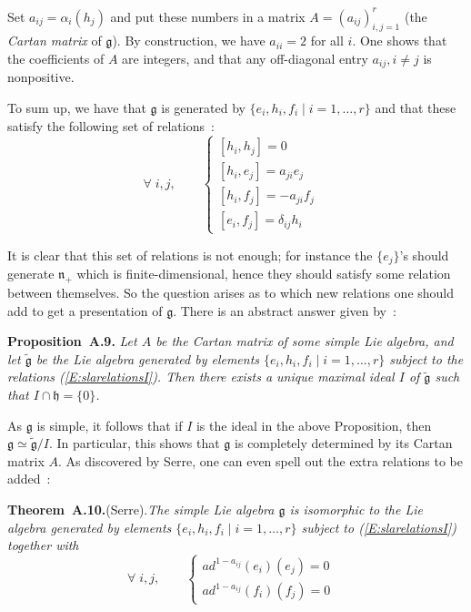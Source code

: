 \documentclass[a4paper,10pt]{amsart}
\def\g{\mathfrak{g}}
\def\h{\mathfrak{h}}
\def\n{\mathfrak{n}}
\numberwithin{equation}{section}
\begin{document}
{Set $a_{ij}=\alpha_i(h_j)$ and put these numbers in a matrix $A=(a_{ij})_{i,j=1}^r$ (the \textit{Cartan matrix} of $\g$). By construction, we have $a_{ii}=2$ for all $i$. One shows that the coefficients of $A$ are integers, and that any off-diagonal entry $a_{ij}, i \neq j$ is nonpositive.

To sum up, we have that $\g$ is generated by $\{e_i, h_i, f_i\;|\; i=1, \ldots , r\}$ and that these satisfy the following set of relations~:
\begin{equation}\label{E:slarelationsI}
\forall\; i,j, \qquad
\begin{cases}
[h_i,h_j]=0 & \\
[h_i, e_j]=a_{ji} e_j & \\
[h_i, f_j]=-a_{ji} f_j &\\
[e_i,f_j]= \delta_{ij} h_i
\end{cases}
\end{equation}

\vspace{.1in}

It is clear that this set of relations is not enough; for instance the $\{e_j\}$'s should generate $\n_+$ which is finite-dimensional, hence they should satisfy some relation between themselves. So the question arises as to which new relations one should add to get a presentation of $\g$. There is an abstract answer given by~:

\vspace{.15in}

\noindent
\textbf{Proposition~A.9.} \textit{Let $A$ be the Cartan matrix of some simple Lie algebra, and let $\widetilde{\g}$ be the Lie algebra generated by elements $\{e_i, h_i, f_i\;|\; i=1, \ldots , r\}$ subject to the relations (\ref{E:slarelationsI}). Then there exists a unique maximal ideal $I$ of $\widetilde{\g}$ such that $I \cap \h =\{0\}$.}

\vspace{.15in}

As $\g$ is simple, it follows that if $I$ is the ideal in the above Proposition, then $\g \simeq \widetilde{\g}/ I$. In particular, this shows that $\g$ is completely determined by its Cartan matrix $A$.
As discovered by Serre, one can even spell out the extra relations to be added~:

\vspace{.15in}

\noindent
\textbf{Theorem~A.10.}(Serre).\textit{The simple Lie algebra $\g$ is isomorphic to the Lie algebra generated by elements $\{e_i, h_i, f_i\;|\; i=1, \ldots , r\}$ subject to (\ref{E:slarelationsI}) together with
\begin{equation}\label{E:Serrerel}
\forall\; i,j, \qquad
\begin{cases}
ad^{1-a_{ij}}(e_i)(e_j)=0 & \\
ad^{1-a_{ij}}(f_i)(f_j)=0 &
\end{cases}
\end{equation}}

}
\end{document}
